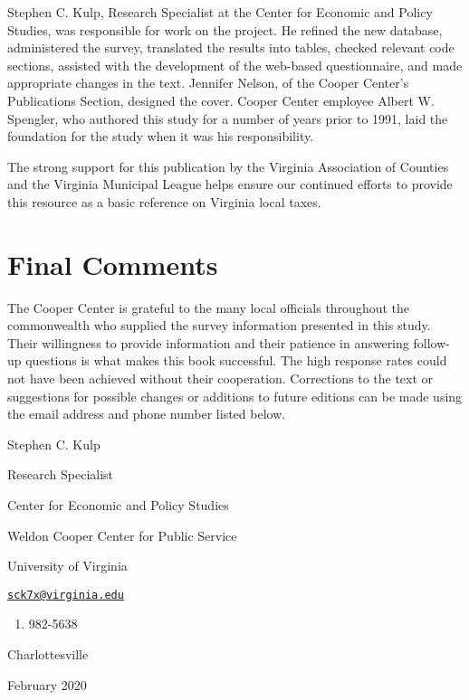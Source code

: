 \documentclass[
]{book}
\providecommand{\tightlist}{%
  \setlength{\itemsep}{0pt}\setlength{\parskip}{0pt}}
\begin{document}
Stephen C. Kulp, Research Specialist at the Center for Economic and Policy Studies, was responsible for work on the project. He refined the new database, administered the survey, translated the results into tables, checked relevant code sections, assisted with the development of the web-based questionnaire, and made appropriate changes in the text. Jennifer Nelson, of the Cooper Center's Publications Section, designed the cover. Cooper Center employee Albert W. Spengler, who authored this study for a number of years prior to 1991, laid the foundation for the study when it was his responsibility.

The strong support for this publication by the Virginia Association of Counties and the Virginia Municipal League helps ensure our continued efforts to provide this resource as a basic reference on Virginia local taxes.

\hypertarget{final-comments}{%
\section{Final Comments}\label{final-comments}}

The Cooper Center is grateful to the many local officials throughout the commonwealth who supplied the survey information presented in this study. Their willingness to provide information and their patience in answering follow-up questions is what makes this book successful. The high response rates could not have been achieved without their cooperation. Corrections to the text or suggestions for possible changes or additions to future editions can be made using the email address and phone number listed below.

Stephen C. Kulp

Research Specialist

Center for Economic and Policy Studies

Weldon Cooper Center for Public Service

University of Virginia

\href{mailto:sck7x@virginia.edu}{\nolinkurl{sck7x@virginia.edu}}

\begin{enumerate}
\def\labelenumi{(\arabic{enumi})}
\setcounter{enumi}{433}
\tightlist
\item
  982-5638
\end{enumerate}

Charlottesville

February 2020
\end{document}
